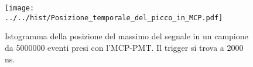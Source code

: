 \begin{figure}[h] \centering \texttt{[image: ../../hist/Posizione\_temporale\_del\_picco\_in\_MCP.pdf]}\caption{Istogramma della posizione del massimo del segnale in un campione da 5000000 eventi presi con l'MCP-PMT. Il trigger si trova a 2000 ns.}\label{hist:Posizione_temporale_del_picco_in_MCP} \end{figure}
